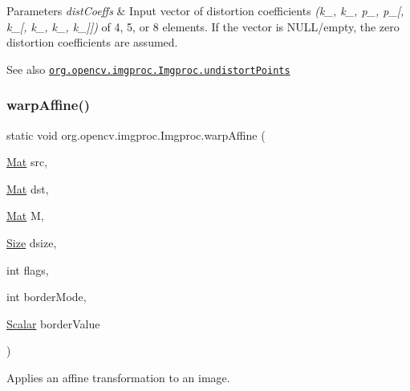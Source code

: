 {\itshape  
\begin{DoxyParams}{Parameters}
{\em dist\+Coeffs} & Input vector of distortion coefficients {\itshape (k\+\_, k\+\_, p\+\_, p\+\_\mbox{[}, k\+\_\mbox{[}, k\+\_, k\+\_, k\+\_\mbox{]}\mbox{]})} of 4, 5, or 8 elements. If the vector is N\+U\+L\+L/empty, the zero distortion coefficients are assumed.\\
\hline
\end{DoxyParams}
\begin{DoxySeeAlso}{See also}
\href{http://docs.opencv.org/modules/imgproc/doc/geometric_transformations.html#undistortpoints}{\tt org.\+opencv.\+imgproc.\+Imgproc.\+undistort\+Points} 
\end{DoxySeeAlso}
}\mbox{\label{classorg_1_1opencv_1_1imgproc_1_1_imgproc_a139ccfb9b241fc867096f4c850088058}} 
\subsubsection{\texorpdfstring{warp\+Affine()}{warpAffine()}\hspace{0.1cm}{\footnotesize\ttfamily [1/3]}}
{\footnotesize\ttfamily static void org.\+opencv.\+imgproc.\+Imgproc.\+warp\+Affine (\begin{DoxyParamCaption}\item[{\mbox{\hyperlink{classorg_1_1opencv_1_1core_1_1_mat}{Mat}}}]{src,  }\item[{\mbox{\hyperlink{classorg_1_1opencv_1_1core_1_1_mat}{Mat}}}]{dst,  }\item[{\mbox{\hyperlink{classorg_1_1opencv_1_1core_1_1_mat}{Mat}}}]{M,  }\item[{\mbox{\hyperlink{classorg_1_1opencv_1_1core_1_1_size}{Size}}}]{dsize,  }\item[{int}]{flags,  }\item[{int}]{border\+Mode,  }\item[{\mbox{\hyperlink{classorg_1_1opencv_1_1core_1_1_scalar}{Scalar}}}]{border\+Value }\end{DoxyParamCaption})\hspace{0.3cm}{\ttfamily [static]}}

Applies an affine transformation to an image.

